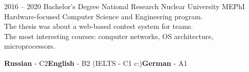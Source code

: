 \documentclass[10pt]{template}
\begin{document}


\begin{entrylist}
	\entry
	{2016 -- 2020}
	{Bachelor's Degree}
	{National Research Nuclear University MEPhI}
	{Hardware-focused Computer Science and Engineering program.\\
	The thesis was about a web-based contest system for teams.\\ 
	The most interesting courses: computer networks, OS architecture, microprocessors.}
\end{entrylist}


\begin{minipage}[t]{0.6\textwidth}
	\vspace{-\baselineskip}
	
		
	\textbf{Russian} - C2\slashsep\textbf{English} - B2 (IELTS - C1 c:)\slashsep\textbf{German} - A1
\end{minipage}


\end{document}
